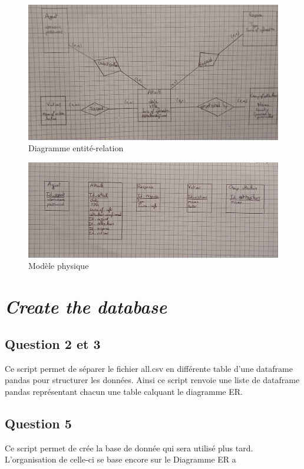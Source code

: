 \documentclass[light]{ceri/sty/rapport}
\begin{document}
\begin{figure}[h]
    \centering
    \includegraphics[width=0.85\linewidth]{images/diag_er.png}
    \caption{Diagramme entité-relation}
    \label{fig:diag_er}
\end{figure}

\begin{figure}[h]
    \centering
    \includegraphics[width=0.85\linewidth]{images/diag_phys.png}
    \caption{Modèle physique}
    \label{fig:diag_phys}
\end{figure}

\section{\textit{Create the database}}
\subsection{Question 2 et 3}
Ce script permet de séparer le fichier all.csv en différente table d'une dataframe pandas pour structurer les données. Ainsi ce script renvoie une liste de dataframe pandas représentant chacun une table calquant le diagramme ER. 

\subsection{Question 5}
Ce script permet de crée la base de donnée qui sera utilisé plus tard. L'organisation de celle-ci se base encore sur le Diagramme ER a
\end{document}
